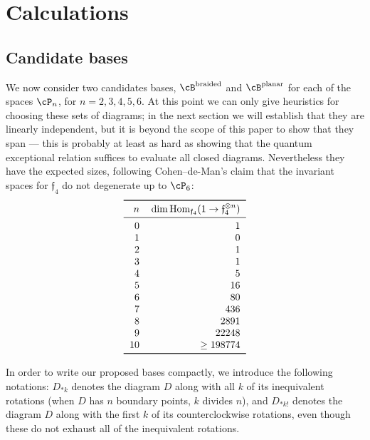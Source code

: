 \documentclass[12pt]{amsart}
\begin{document}
\section{Calculations}
\label{sec:calculations}
\newcommand{\V}{\mathcal{P}}

\subsection{Candidate bases}
\label{sec:bases}
We now consider two candidates bases, $\cB^{\text{braided}}$ and $\cB^{\text
{planar}}$ for each of the spaces $\cP_n$, for $n = 2,3,4,5,6$.
At this point we can only give heuristics for choosing these sets of diagrams;
in the next section we will establish that they are linearly independent, but
it is beyond the scope of this paper to show that they span --- this is
probably at least as hard as showing that the quantum exceptional relation
suffices to evaluate all closed diagrams. Nevertheless they have the expected
sizes, following Cohen--de-Man's claim that the invariant spaces for
$\mathfrak{f}_4$ do not degenerate up to $\cP_6$:
\[
\begin{tabular}{rr}
  \toprule
  $n$ & $\dim \Hom_{\mathfrak{f}_4} (1 \to \mathfrak{f}_4^{\otimes n})$ \\
  \midrule
  0 & 1 \\ 1 & 0 \\ 2 & 1 \\ 3 & 1 \\ 4 & 5 \\ 5 & 16 \\
  6 & 80 \\ 7 & 436 \\ 8 & 2891 \\ 9 & 22248 \\ 10 & $\ge 198774$ \\
  \bottomrule
\end{tabular}
\]


\newcommand{\diagram}[2]{\mathfig{#1}{graphs/urn_sha1_#2.pdf}}

In order to write our proposed bases compactly, we introduce the following
notations: $D_{*k}$ denotes the diagram $D$ along with all $k$ of its
inequivalent rotations (when $D$ has $n$ boundary points, $k$ divides $n$),
and $D_{*k!}$ denotes the diagram $D$ along with the first $k$ of its
counterclockwise rotations, even though these do not exhaust all of the
inequivalent rotations.
\end{document}
